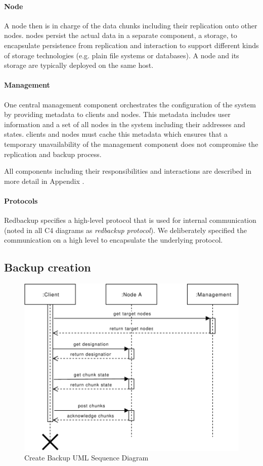 \paragraph{Node}
A \gls{node} then is in charge of the data \glspl{chunk} including their replication onto other \glspl{node}. \Glspl{node} persist the actual data in a separate component, a \gls{storage}, to encapsulate persistence from replication and interaction to support different kinds of storage technologies (e.g. plain file systems or databases). A \gls{node} and its \gls{storage} are typically deployed on the same host.

\paragraph{Management}
One central \gls{management} component orchestrates the configuration of the system by providing metadata to \glspl{client} and \glspl{node}. This metadata includes user information and a set of all \glspl{node} in the system including their addresses and states. \Glspl{client} and \glspl{node} must cache this metadata which ensures that a temporary unavailability of the \gls{management} component does not compromise the replication and backup process.

All components including their responsibilities and interactions are described in more detail in Appendix .

\paragraph{Protocols} Redbackup specifies a high-level protocol that is used for internal communication (noted in all C4 diagrams as \emph{redbackup protocol}). We deliberately specified the communication on a high level to encapsulate the underlying protocol.

\subsection{Backup creation}
\begin{figure}[h]
    \centering
    \includegraphics[width=\linewidth]{resources/create_backup}
    \caption{Create Backup UML Sequence Diagram}
\end{figure}

